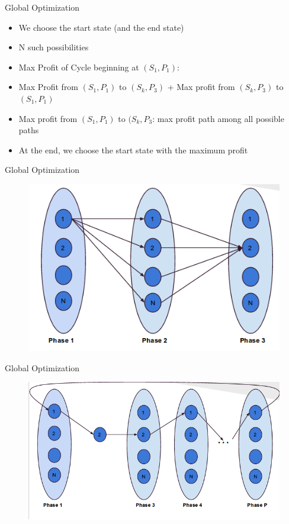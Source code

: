 \documentclass{beamer}
\begin{document}
\begin{frame}{Global Optimization}
\begin{itemize}
\item We choose the start state (and the end state)
\item N such possibilities
\item Max Profit of Cycle beginning at $(S_1, P_1)$:
\item Max Profit from $(S_1, P_1)$ to $(S_k, P_3)$ + Max profit from $(S_k, P_3)$ to $(S_1, P_1)$
\item Max profit from $(S_1, P_1)$ to $(S_k, P_3$: max profit path among all possible paths
\item At the end, we choose the start state with the maximum profit
\end{itemize}
\end{frame}

\begin{frame}{Global Optimization}
\begin{figure}
\includegraphics[scale=0.5]{images/go0}
\end{figure}
\end{frame}

\begin{frame}{Global Optimization}
\begin{figure}
\includegraphics[scale=0.5]{images/go1}
\end{figure}
\end{frame}
\end{document}
